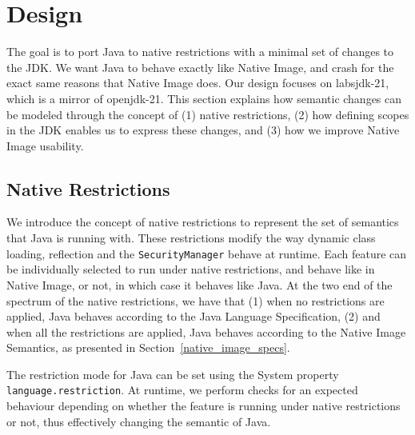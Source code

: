 

\chapter{Design}

The goal is to port Java to native restrictions with a minimal set of changes to the JDK. We want Java to behave exactly like Native Image, and crash for the exact same reasons that Native Image does. Our design focuses on labsjdk-21, which is a mirror of openjdk-21. 
This section explains how semantic changes can be modeled through the concept of (1) native restrictions, (2) how defining scopes in the JDK enables us to express these changes, and (3) how we improve Native Image usability.

\section{Native Restrictions}
We introduce the concept of native restrictions to represent the set of semantics that Java is running with. These restrictions modify the way dynamic class loading, reflection and the \verb|SecurityManager| behave at runtime. Each feature can be individually selected to run under native restrictions, and behave like in Native Image, or not, in which case it behaves like Java.
At the two end of the spectrum of the native restrictions, we have that (1) when no restrictions are applied, Java behaves according to the Java Language Specification, (2) and when all the restrictions are applied, Java behaves according to the Native Image Semantics, as presented in Section~\ref{native_image_specs}. 

The restriction mode for Java can be set using the System property \verb|language.restriction|. At runtime, we perform checks for an expected behaviour depending on whether the feature is running under native restrictions or not, thus effectively changing the semantic of Java.

